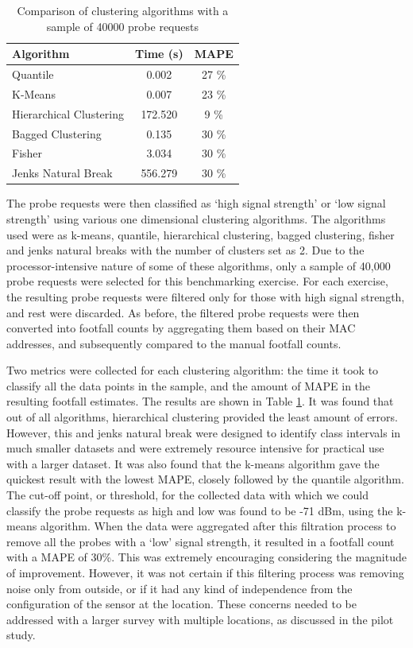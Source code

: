 \begin{table}
  \footnotesize
  \caption{Comparison of clustering algorithms with a sample of 40000 probe requests}
  \centering
  \begin{tabular}{lcc} 
    \toprule
     Algorithm				      	& Time (s)& MAPE\\
    \midrule
     Quantile				        	& 0.002 	& 27 \% \\
     K-Means			 	        	& 0.007 	& 23 \% \\
     Hierarchical Clustering	& 172.520	&  9 \% \\
     Bagged Clustering 		  	& 0.135 	& 30 \% \\
     Fisher 				        	& 3.034 	& 30 \% \\
     Jenks Natural Break 	   	& 556.279	& 30 \% \\
     \bottomrule
  \end{tabular}
  \label{table:processing:oxst:classification}
\end{table}

The probe requests were then classified as ‘high signal strength’ or ‘low signal strength’ using various one dimensional clustering algorithms.
The algorithms used were as k-means, quantile, hierarchical clustering, bagged clustering, fisher and jenks natural breaks with the number of clusters set as 2.
Due to the processor-intensive nature of some of these algorithms, only a sample of 40,000 probe requests were selected for this benchmarking exercise.
For each exercise, the resulting probe requests were filtered only for those with high signal strength, and rest were discarded.
As before, the filtered probe requests were then converted into footfall counts by aggregating them based on their MAC addresses, and subsequently compared to the manual footfall counts.

Two metrics were collected for each clustering algorithm: the time it took to classify all the data points in the sample, and the amount of MAPE in the resulting footfall estimates.
The results are shown in Table \ref{table:processing:oxst:classification}.
It was found that out of all algorithms, hierarchical clustering provided the least amount of errors.
However, this and jenks natural break were designed to identify class intervals in much smaller datasets and were extremely resource intensive for practical use with a larger dataset.
It was also found that the k-means algorithm gave the quickest result with the lowest MAPE, closely followed by the quantile algorithm.
The cut-off point, or threshold, for the collected data with which we could classify the probe requests as high and low was found to be -71 dBm, using the k-means algorithm.
When the data were aggregated after this filtration process to remove all the probes with a ‘low’ signal strength, it resulted in a footfall count with a MAPE of 30\%.
This was extremely encouraging considering the magnitude of improvement.
However, it was not certain if this filtering process was  removing noise only from outside, or if it had any kind of independence from the configuration of the sensor at the location.
These concerns needed to be addressed with a larger survey with multiple locations, as discussed in the pilot study.

